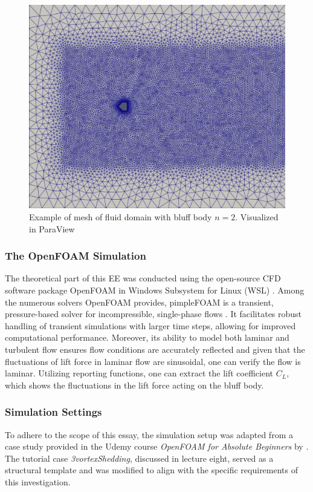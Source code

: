 \begin{figure}[H]
	\centering
	\includegraphics[width=\textwidth]{images/2FaceMesh}
	\caption{Example of mesh of fluid domain with bluff body $n = 2$. Visualized in ParaView}
	\label{fig:2FaceMesh}
\end{figure}

\subsubsection{The OpenFOAM Simulation}
\label{sec:openFoam}
The theoretical part of this EE was conducted using the open-source CFD software package OpenFOAM \parencite{noauthor_openfoam_2024} in Windows Subsystem for Linux (WSL) \parencite{noauthor_windows_nodate}. Among the numerous solvers OpenFOAM provides, pimpleFOAM is a transient, pressure-based solver for incompressible, single-phase flows \parencite{noauthor_pimplefoam_nodate}. It facilitates robust handling of transient simulations with larger time steps, allowing for improved computational performance. Moreover, its ability to model both laminar and turbulent flow ensures flow conditions are accurately reflected and given that the fluctuations of lift force in laminar flow are sinusoidal, one can verify the flow is laminar. Utilizing reporting functions, one can extract the lift coefficient $C_{L}$, which shows the fluctuations in the lift force acting on the bluff body.
\subsubsection{Simulation Settings}
\label{sec:simulationSettings}
To adhere to the scope of this essay, the simulation setup was adapted from a case study provided in the Udemy course \textit{OpenFOAM for Absolute Beginners} by \textcite{jayaraj2024openfoam}. The tutorial case \textit{3vortexShedding}, discussed in lecture eight, served as a structural template and was modified to align with the specific requirements of this investigation.


